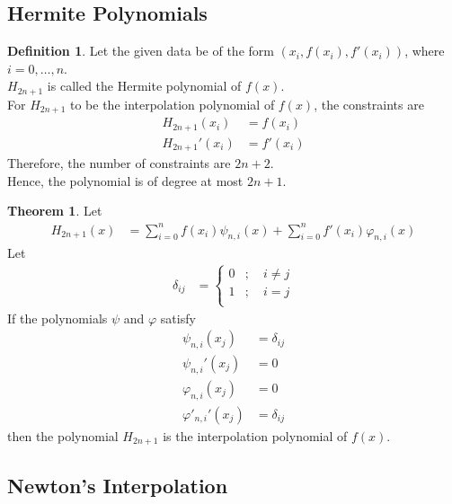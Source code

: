 \documentclass[fleqn, a4paper, 12pt, twoside]{article}
\theoremstyle{definition}
\newtheorem{definition}{Definition}
\theoremstyle{theorem}
\newtheorem{theorem}{Theorem}
\begin{document}
\subsection{Hermite Polynomials}

\begin{definition}
	Let the given data be of the form $\left( x_i , f(x_i) , f'(x_i) \right)$, where $i = 0,\dots,n$.\\
	$H_{2 n + 1}$ is called the Hermite polynomial of $f(x)$.\\
	For $H_{2 n + 1}$ to be the interpolation polynomial of $f(x)$, the constraints are
	\begin{align*}
		H_{2 n + 1}(x_i)  & = f(x_i) \\
		H_{2 n + 1}'(x_i) & = f'(x_i)
	\end{align*}
	Therefore, the number of constraints are $2 n + 2$.\\
	Hence, the polynomial is of degree at most $2 n + 1$.\\
\end{definition}

\begin{theorem}
	Let
	\begin{align*}
		H_{2 n + 1}(x) & = \sum\limits_{i = 0}^{n} f(x_i) \psi_{n,i}(x) + \sum\limits_{i = 0}^{n} f'(x_i) \varphi_{n,i}(x)
	\end{align*}
	Let
	\begin{align*}
		\delta_{i j} &=
			\begin{cases}
				0 & ;\quad i \neq j \\
				1 & ;\quad i = j    \\
			\end{cases}
	\end{align*}
	If the polynomials $\psi$ and $\varphi$ satisfy
	\begin{align*}
		\psi_{n,i}(x_j)        & = \delta_{i j} \\
		{\psi_{n,i}}'(x_j)     & = 0            \\
		\varphi_{n,i}(x_j)     & = 0            \\
		{\varphi'_{n,i}}'(x_j) & = \delta_{i j}
	\end{align*}
	then the polynomial $H_{2 n + 1}$ is the interpolation polynomial of $f(x)$.
\end{theorem}

\subsection{Newton's Interpolation}
\end{document}
